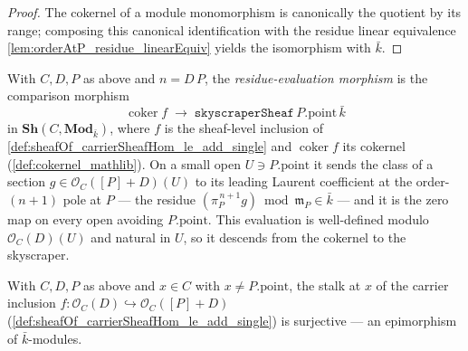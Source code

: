 \begin{proof}
  The cokernel of a module monomorphism is canonically the quotient by its
  range; composing this canonical identification with the residue linear
  equivalence \cref{lem:orderAtP_residue_linearEquiv} yields the isomorphism
  with \(\bar k\).
\end{proof}

\begin{definition}
  \label{def:cokernel_skyscraper_hom}
  With \(C, D, P\) as above and \(n = D\,P\), the \emph{residue-evaluation
  morphism} is the comparison morphism
  \[
    \operatorname{coker} f \;\longrightarrow\;
    \texttt{skyscraperSheaf}\,P.\mathrm{point}\,\bar k
  \]
  in \(\mathbf{Sh}(C, \mathbf{Mod}_{\bar k})\), where \(f\) is the sheaf-level
  inclusion of \cref{def:sheafOf_carrierSheafHom_le_add_single} and
  \(\operatorname{coker} f\) its cokernel (\cref{def:cokernel_mathlib}). On a
  small open \(U \ni P.\mathrm{point}\) it sends the class of a section
  \(g \in \mathcal O_C([P]+D)(U)\) to its leading Laurent coefficient at the
  order-\((n+1)\) pole at \(P\) --- the residue
  \((\pi_P^{\,n+1} g) \bmod \mathfrak m_P \in \bar k\) --- and it is the zero map
  on every open avoiding \(P.\mathrm{point}\). This evaluation is well-defined
  modulo \(\mathcal O_C(D)(U)\) and natural in \(U\), so it descends from the
  cokernel to the skyscraper.
\end{definition}

\begin{lemma}

  \label{lem:stalkFunctor_map_carrierPresheaf_le_hom_epi_of_ne}
  With \(C, D, P\) as above and \(x \in C\) with \(x \neq P.\mathrm{point}\), the
  stalk at \(x\) of the carrier inclusion
  \(f : \mathcal O_C(D) \hookrightarrow \mathcal O_C([P]+D)\)
  (\cref{def:sheafOf_carrierSheafHom_le_add_single}) is surjective --- an
  epimorphism of \(\bar k\)-modules.
\end{lemma}

